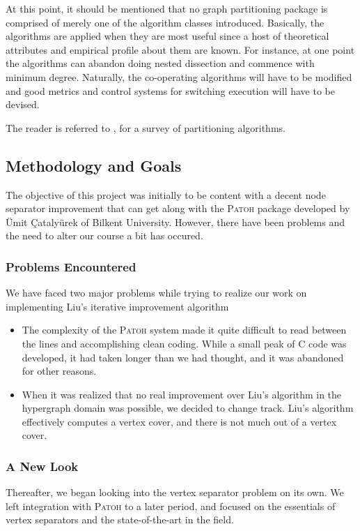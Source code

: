 \documentclass[a4paper,12pt]{article}
\begin{document}
At this point, it should be mentioned that no graph partitioning
package is comprised of merely one of the algorithm classes
introduced. Basically, the algorithms are applied when they are most
useful since a host of theoretical attributes and empirical profile
about them are known. For instance, at one point the algorithms can
abandon doing nested dissection and commence with minimum
degree.\cite{bend} Naturally, the co-operating algorithms will have to be
modified and good metrics and control systems for switching execution
will have to be devised.

The reader is referred to \cite{kumar}, \cite{bend} for a survey of
partitioning algorithms.

\subsection{Methodology and Goals}

The objective of this project was initially to be content with a
decent node separator improvement that can get along with the
\textsc{Patoh} package developed by \"{U}mit \c{C}ataly\"urek of Bilkent
University. However, there have been problems and the need to
alter our course a bit has occured.

\subsubsection{Problems Encountered}
We have faced two major problems while trying to realize our work
on implementing Liu's iterative improvement algorithm
\begin{itemize}
\item The complexity of the \textsc{Patoh} system made it quite
difficult to read between the lines and accomplishing clean
coding. While a small peak of C code was developed, it had taken
longer than we had thought, and it was abandoned for other reasons.
\item When it was realized that no real improvement over Liu's
algorithm in the hypergraph domain was possible, we decided to change
track. Liu's algorithm effectively computes a vertex cover, and there
is not much out of a vertex cover.
\end{itemize}

\subsubsection{A New Look}
Thereafter, we began looking into the vertex separator problem on its
own. We left integration with \textsc{Patoh} to a later period, and
focused on the essentials of vertex separators and the
state-of-the-art in the field.
\end{document}
